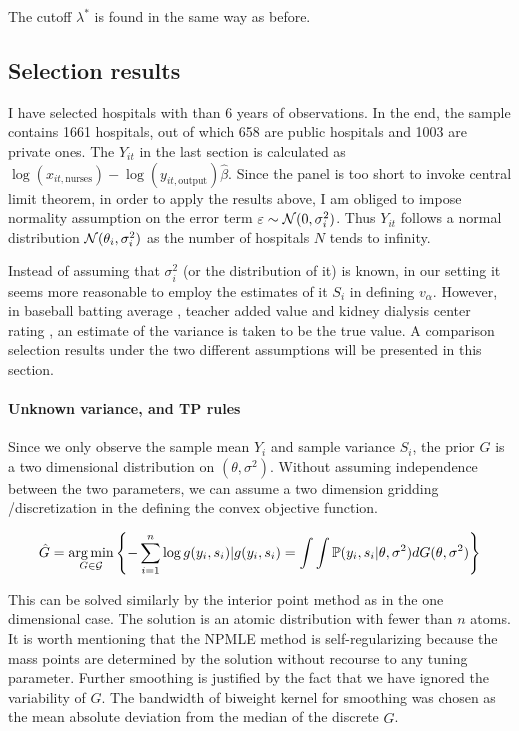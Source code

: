 \documentclass[12pt]{article}
\begin{document}
The cutoff $\lambda^*$ is found in the same way as before.

\subsection{Selection results}
I have selected hospitals with than 6 years of observations. In the end, the
sample contains 1661 hospitals, out of which 658 are public hospitals and 1003
are private ones. The $Y_{it}$ in the last section is calculated as $
    \log(x_{it,\text{nurses}}) - \log(y_{it,\text{output}})\hat{\beta}$. Since the
panel is too short to invoke central limit theorem, in order to apply the
results above, I am obliged to impose normality assumption on the error term
$\varepsilon \sim \mathcal{N}(0,\sigma_i^2)$. Thus $Y_{it}$ follows a normal
distribution $\mathcal{N}(\theta_i,\sigma_i^2)$ as the number of hospitals $N$ tends
to infinity.

Instead of assuming that $\sigma_i^2$ (or the distribution of it) is known, in
our setting it seems more reasonable to employ the estimates of it $S_i$ in
defining $v_\alpha$. However, in baseball batting average
\citep{gu2017empirical}, teacher added value \citep{gilraine2020new} and kidney
dialysis center rating \citep{gu2023invidious}, an estimate of the variance is
taken to be the true value. A comparison selection results under the two
different assumptions will be presented in this section.
\paragraph{Unknown variance, and TP rules} Since we only observe the sample mean
$Y_i$ and sample variance $S_i$, the prior $G$ is a two dimensional
distribution on $(\theta,\sigma^2)$. Without assuming independence between the
two parameters, we can assume a two dimension gridding /discretization in the
defining the convex objective function.

\begin{equation*}
    \hat{G}=\operatorname*{arg\,min}_{G\in \mathcal{G}} \left\{-\sum_{i=1}^{n}\log g(y_i,s_i)|g(y_i,s_i)=\int \int  \mathbb{P}(y_i,s_i |\theta,\sigma^2)dG(\theta,\sigma^2) \right\}
\end{equation*}

This can be solved similarly by the interior point method as in the one
dimensional case. The solution is an atomic distribution with fewer than $n$
atoms. It is worth mentioning that the NPMLE method is self-regularizing
because the mass points are determined by the solution without recourse to any
tuning parameter. Further smoothing is justified by the fact that we have
ignored the variability of $G$. The bandwidth of biweight kernel for smoothing
was chosen as the mean absolute deviation from the median of the discrete
$\hat{G}$.
\end{document}
